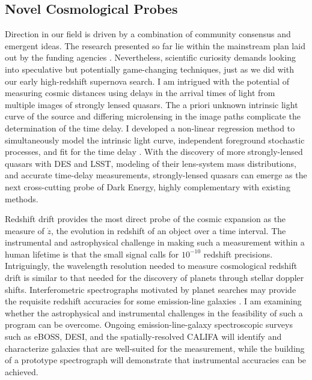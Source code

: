 \documentclass[12pt]{article}
\begin{document}
\subsection{Novel Cosmological Probes}
Direction in our field is driven by a combination of community consensus and emergent ideas.
The research presented so far  lie  within the
mainstream plan laid out by the funding agencies
\cite{2013arXiv1309.5386D,2013arXiv1309.5382K}.
Nevertheless, scientific curiosity demands looking into speculative but potentially game-changing
techniques, just as we did with our early high-redshift supernova search.
I am intrigued with the potential of measuring cosmic distances using delays in the arrival times of light from multiple images
of strongly lensed quasars.  The a priori unknown intrinsic light curve of the source and differing microlensing
in the image paths complicate the determination of the time delay.  I developed a
non-linear regression method to simultaneously model the intrinsic light curve, independent foreground
stochastic processes, and fit for the time delay \cite{2013PhRvD..87l3512H}.  With the discovery of more 
strongly-lensed quasars with DES and LSST, modeling of their lens-system mass distributions, and accurate
time-delay measurements, strongly-lensed
quasars can emerge as the next cross-cutting probe of Dark Energy, highly complementary with existing methods.

Redshift drift provides the most direct  probe
of the cosmic expansion as the measure of $\dot{z}$, the evolution in redshift of an object over a time interval.
The instrumental
and astrophysical challenge
in making such a measurement within a human lifetime
is that the small signal calls for $10^{-10}$ redshift precisions.  Intriguingly, the wavelength resolution needed to measure
cosmological redshift drift is similar to that needed for the discovery of planets through stellar doppler shifts.
Interferometric spectrographs motivated by planet searches may provide the
requisite redshift accuracies for some emission-line galaxies
\cite{2014arXiv1402.6614K}.
I  am examining whether the astrophysical and instrumental challenges in the feasibility of such a program can be overcome.
Ongoing  emission-line-galaxy  spectroscopic surveys such
as eBOSS, DESI, and the spatially-resolved CALIFA will identify and characterize
galaxies that are well-suited for the measurement, while the building of a prototype spectrograph will demonstrate that
instrumental  accuracies can be achieved.
\end{document}
